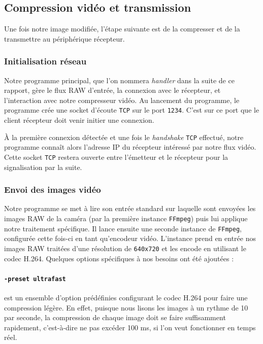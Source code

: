 \documentclass[11pt,a4paper]{article}
\begin{document}
\subsection{Compression vidéo et transmission}
Une fois notre image modifiée, l'étape suivante est de la compresser et de la transmettre au périphérique récepteur.

\subsubsection{Initialisation réseau}
Notre programme principal, que l'on nommera \textit{handler} dans la suite de ce rapport, gère le flux RAW d'entrée, la connexion avec le récepteur, et l'interaction avec notre compresseur vidéo.
Au lancement du programme, le programme crée une socket d'écoute \texttt{TCP} sur le port \texttt{1234}.
C'est sur ce port que le client récepteur doit venir initier une connexion.

\bigbreak
À la première connexion détectée et une fois le \textit{handshake} \texttt{TCP} effectué, notre programme connaît alors l'adresse IP du récepteur intéressé par notre flux vidéo.
Cette socket \texttt{TCP} restera ouverte entre l'émetteur et le récepteur pour la signalisation par la suite.

\subsubsection{Envoi des images vidéo}
Notre programme se met à lire son entrée standard sur laquelle sont envoyées les images RAW de la caméra (par la première instance \texttt{FFmpeg}) puis lui applique notre traitement spécifique.
Il lance ensuite une seconde instance de \texttt{FFmpeg}, configurée cette fois-ci en tant qu'encodeur vidéo.
L'instance prend en entrée nos images RAW traitées d'une résolution de \texttt{640x720} et les encode en utilisant le codec H.264.
Quelques options spécifiques à nos besoins ont été ajoutées :

\paragraph{\texttt{-preset ultrafast}} est un ensemble d'option prédéfinies configurant le codec H.264 pour faire une compression légère.
En effet, puisque nous lisons les images à un rythme de 10 par seconde, la compression de chaque image doit se faire suffisamment rapidement, c'est-à-dire ne pas excéder 100 ms, si l'on veut fonctionner en temps réel.
\end{document}
